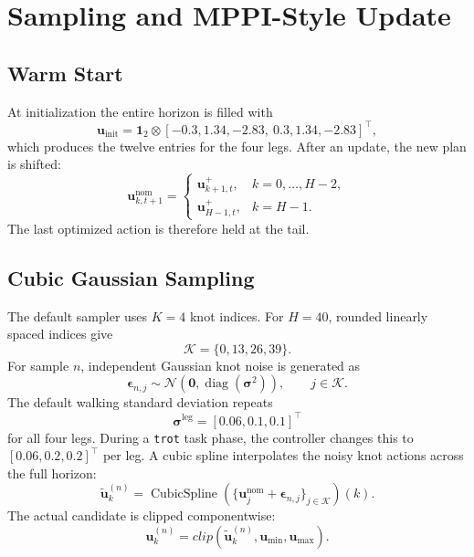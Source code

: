 \documentclass[11pt,a4paper]{article}
\newcommand{\diag}{\operatorname{diag}}
\newcommand{\code}[1]{\texttt{#1}}
\begin{document}
\section{Sampling and MPPI-Style Update}

\subsection{Warm Start}

At initialization the entire horizon is filled with
\begin{equation}
\bm{u}_{\mathrm{init}}=
\bm{1}_2\otimes
[-0.3,1.34,-2.83,\ 0.3,1.34,-2.83]^\top,
\end{equation}
which produces the twelve entries for the four legs.  After an update, the
new plan is shifted:
\begin{equation}
  \bm{u}_{k,t+1}^{\mathrm{nom}}=
  \begin{cases}
    \bm{u}_{k+1,t}^{+}, & k=0,\ldots,H-2,\\
    \bm{u}_{H-1,t}^{+}, & k=H-1.
  \end{cases}
  \label{eq:warm_start}
\end{equation}
The last optimized action is therefore held at the tail.

\subsection{Cubic Gaussian Sampling}

The default sampler uses $K=4$ knot indices.  For $H=40$, rounded linearly
spaced indices give
\begin{equation}
  \mathcal{K}=\{0,13,26,39\}.
\end{equation}
For sample $n$, independent Gaussian knot noise is generated as
\begin{equation}
  \bm{\epsilon}_{n,j}\sim
  \mathcal{N}(\bm{0},\diag(\bm{\sigma}^2)),
  \qquad j\in\mathcal{K}.
\end{equation}
The default walking standard deviation repeats
\begin{equation}
  \bm{\sigma}^{\mathrm{leg}}=[0.06,0.1,0.1]^\top
\end{equation}
for all four legs.  During a \code{trot} task phase, the controller changes
this to $[0.06,0.2,0.2]^\top$ per leg.  A cubic spline interpolates the noisy
knot actions across the full horizon:
\begin{equation}
  \tilde{\bm{u}}^{(n)}_k=
  \operatorname{CubicSpline}
  \left(\{\bm{u}^{\mathrm{nom}}_j+\bm{\epsilon}_{n,j}\}_{j\in\mathcal{K}}
  \right)(k).
\end{equation}
The actual candidate is clipped componentwise:
\begin{equation}
  \bm{u}^{(n)}_k=clip
  (\tilde{\bm{u}}^{(n)}_k,\bm{u}_{\min},\bm{u}_{\max}).
\end{equation}
\end{document}
